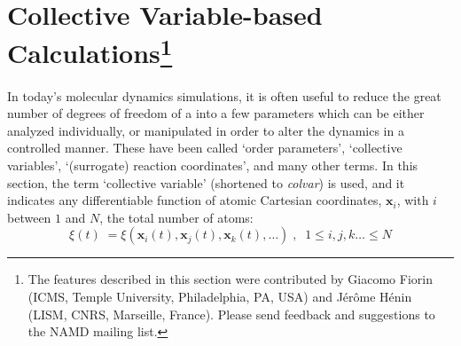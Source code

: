 
\section{Collective Variable-based Calculations\footnote{ The features
described in this section were contributed by Giacomo Fiorin (ICMS,
Temple University, Philadelphia, PA, USA) and J\'er\^ome H\'enin (LISM,
CNRS, Marseille, France). Please send feedback and suggestions
to the NAMD mailing list.}}
\label{section:colvars}

In today's molecular dynamics simulations, it is often useful to
reduce the great number of degrees of freedom of a into a few
parameters which can be either analyzed individually, or manipulated
in order to alter the dynamics in a controlled manner.  These have
been called `order parameters', `collective variables', `(surrogate)
reaction coordinates', and many other terms.  In this section, the
term `collective variable' (shortened to \textit{colvar}) is used, and
it indicates any differentiable function of atomic Cartesian
coordinates, $\bm{x}_{i}$, with $i$ between $1$ and $N$, the total
number of atoms:
\begin{equation} 
  \label{eq:colvar_basic}
  \xi(t) \; = \xi\left(\bm{x}_{i}(t), \bm{x}_{j}(t), \bm{x}_{k}(t),
  \ldots \right)\;, \;\; 1 \leq i,j,k\ldots \leq N
\end{equation}

